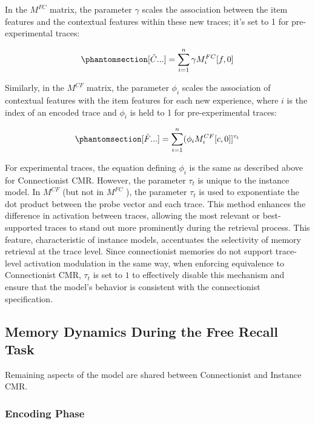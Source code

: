 \documentclass[
  letterpaper,
  11pt,
  english,
  singlespacing,
  headsepline]{MastersDoctoralThesis}
\begin{document}
In the \(M^{FC}\) matrix, the parameter \(\gamma\) scales the
association between the item features and the contextual features within
these new traces; it's set to 1 for pre-experimental traces:

\begin{equation}\phantomsection\label{eq-10}{
[\hat{C} ...] = \sum_{i=1}^{n} \gamma M^{FC}_{i} [f, 0]
}\end{equation}

Similarly, in the \(M^{CF}\) matrix, the parameter \(\phi_{i}\) scales
the association of contextual features with the item features for each
new experience, where \(i\) is the index of an encoded trace and
\(\phi_i\) is held to 1 for pre-experimental traces:

\begin{equation}\phantomsection\label{eq-11}{
[\hat{F} ...] = \sum_{i=1}^{n} (\phi_i M^{CF}_{i} [c, 0] ]^{\tau_{t}}
}\end{equation}

For experimental traces, the equation defining \(\phi_i\) is the same as
described above for Connectionist CMR. However, the parameter \(\tau_t\)
is unique to the instance model. In \(M^{CF}\) (but not in \(M^{FC}\) ),
the parameter \(\tau_t\) is used to exponentiate the dot product between
the probe vector and each trace. This method enhances the difference in
activation between traces, allowing the most relevant or best-supported
traces to stand out more prominently during the retrieval process. This
feature, characteristic of instance models, accentuates the selectivity
of memory retrieval at the trace level. Since connectionist memories do
not support trace-level activation modulation in the same way, when
enforcing equivalence to Connectionist CMR, \(\tau_{t}\) is set to \(1\)
to effectively disable this mechanism and ensure that the model's
behavior is consistent with the connectionist specification.

\subsection{Memory Dynamics During the Free Recall
Task}\label{memory-dynamics-during-the-free-recall-task}

Remaining aspects of the model are shared between Connectionist and
Instance CMR.

\subsubsection{Encoding Phase}\label{encoding-phase}
\end{document}
